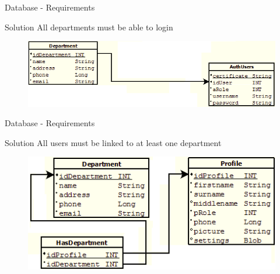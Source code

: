 \begin{frame}{Database - Requirements}
    \begin{block}{Solution}
					All departments must be able to login

\begin{figure}[h]
	\centering
		\includegraphics[width=1.00\textwidth]{Img/DatabaseDept.png}
	\label{fig:DatabaseDept}
\end{figure}
   \end{block}
\end{frame}

\begin{frame}{Database - Requirements}
    \begin{block}{Solution}
					All users must be linked to at least one department

\begin{figure}[h]
	\centering
		\includegraphics[width=1.00\textwidth]{Img/DatabaseProfileDeptRelation.png}
\end{figure}

   \end{block}
\end{frame}

